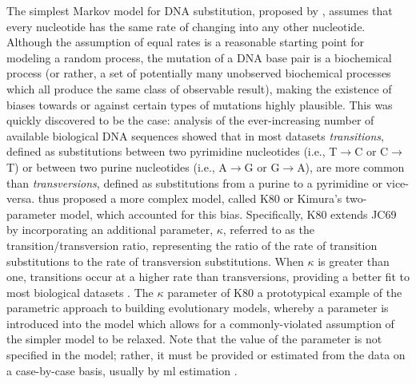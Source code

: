 The simplest Markov model for DNA substitution, proposed by
\citet{Jukes1969a}, assumes that every nucleotide has the same rate of
changing into any other nucleotide. Although the assumption of equal
rates is a reasonable starting point for modeling a random process,
the mutation of a DNA base pair is a biochemical process (or rather, a
set of potentially many unobserved biochemical processes which all
produce the same class of observable result), making the existence of
biases towards or against certain types of mutations highly
plausible. This was quickly discovered to be the case: analysis of the
ever-increasing number of available biological DNA sequences showed
that in most datasets \emph{transitions}, defined as substitutions
between two pyrimidine nucleotides (i.e., T$\to$C or C$\to$T) or
between two purine nucleotides (i.e., A$\to$G or G$\to$A), are more
common than \emph{transversions}, defined as substitutions from a
purine to a pyrimidine or vice-versa. \citet{Kimura1980} thus proposed
a more complex model, called K80 or Kimura's two-parameter model,
which accounted for this bias. Specifically, K80 extends JC69 by
incorporating an additional parameter, $\kappa$, referred to as the
transition/transversion ratio, representing the ratio of the rate of
transition substitutions to the rate of transversion
substitutions. When $\kappa$ is greater than one, transitions occur at
a higher rate than transversions, providing a better fit to most
biological datasets \citep{Brown1982}. The $\kappa$ parameter of K80 a
prototypical example of the parametric approach to building
evolutionary models, whereby a parameter is introduced into the model
which allows for a commonly-violated assumption of the simpler model
to be relaxed. Note that the value of the parameter is not specified
in the model; rather, it must be provided or estimated from the data
on a case-by-case basis, usually by \ac{ml} estimation
\citep{Whelan2001}.

